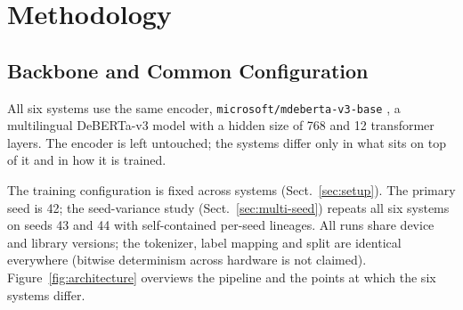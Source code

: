 \section{Methodology}
\label{sec:method}

\subsection{Backbone and Common Configuration}
All six systems use the same encoder, \texttt{microsoft/mdeberta-v3-base}
\cite{he2023debertav3,liu2024mdeberta}, a multilingual DeBERTa-v3 model with a
hidden size of 768 and 12 transformer layers.  The encoder is left untouched;
the systems differ only in what sits on top of it and in how it is trained.

The training configuration is fixed across systems (Sect.~\ref{sec:setup}).
The primary seed is 42; the seed-variance study (Sect.~\ref{sec:multi-seed})
repeats all six systems on seeds 43 and 44 with self-contained per-seed
lineages.  All runs share device and library versions; the tokenizer, label mapping
and split are identical everywhere (bitwise determinism across hardware is not
claimed).  Figure~\ref{fig:architecture} overviews the pipeline and the points at
which the six systems differ.

